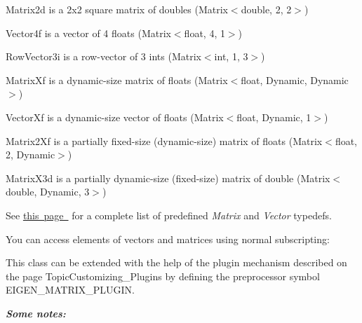 \begin{DoxyItemize}
\item {\ttfamily Matrix2d} is a 2x2 square matrix of doubles ({\ttfamily Matrix$<$double, 2, 2$>$}) \item {\ttfamily Vector4f} is a vector of 4 floats ({\ttfamily Matrix$<$float, 4, 1$>$}) \item {\ttfamily Row\+Vector3i} is a row-\/vector of 3 ints ({\ttfamily Matrix$<$int, 1, 3$>$})\end{DoxyItemize}
\begin{DoxyItemize}
\item {\ttfamily Matrix\+Xf} is a dynamic-\/size matrix of floats ({\ttfamily Matrix$<$float, Dynamic, Dynamic$>$}) \item {\ttfamily Vector\+Xf} is a dynamic-\/size vector of floats ({\ttfamily Matrix$<$float, Dynamic, 1$>$})\end{DoxyItemize}
\begin{DoxyItemize}
\item {\ttfamily Matrix2\+Xf} is a partially fixed-\/size (dynamic-\/size) matrix of floats ({\ttfamily Matrix$<$float, 2, Dynamic$>$}) \item {\ttfamily Matrix\+X3d} is a partially dynamic-\/size (fixed-\/size) matrix of double ({\ttfamily Matrix$<$double, Dynamic, 3$>$})\end{DoxyItemize}
See \mbox{\hyperlink{group__matrixtypedefs}{this page }} for a complete list of predefined {\itshape Matrix} and {\itshape Vector} typedefs.

You can access elements of vectors and matrices using normal subscripting\+:


\begin{DoxyCode}{0}
\DoxyCodeLine{}
\end{DoxyCode}


This class can be extended with the help of the plugin mechanism described on the page Topic\+Customizing\+\_\+\+Plugins by defining the preprocessor symbol {\ttfamily E\+I\+G\+E\+N\+\_\+\+M\+A\+T\+R\+I\+X\+\_\+\+P\+L\+U\+G\+IN}.

{\itshape {\bfseries{Some notes\+:}}}


